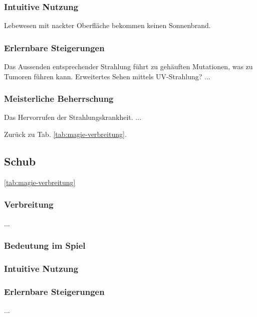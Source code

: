 \subsubsection{Intuitive Nutzung}
Lebewesen mit nackter Oberfläche bekommen keinen Sonnenbrand.

\subsubsection{Erlernbare Steigerungen}
\begin{outline}
	\1 Das Aussenden entsprechender Strahlung führt zu gehäuften Mutationen, was zu Tumoren führen kann.
	\1 Erweitertes Sehen mittels UV-Strahlung?
	\1 ...
\end{outline}

\subsubsection{Meisterliche Beherrschung} 
\begin{outline}
	\1 Das Hervorrufen der Strahlungskrankheit.
	\1 ...
\end{outline}
Zurück zu Tab. \ref{tab:magie-verbreitung}.



\subsection{Schub}\label{sec:schubmagie} \ref{tab:magie-verbreitung} %

\subsubsection{Verbreitung}
...\\

\subsubsection{Bedeutung im Spiel}

\subsubsection{Intuitive Nutzung}

\subsubsection{Erlernbare Steigerungen}
\begin{outline}
	\1 ...
\end{outline}

